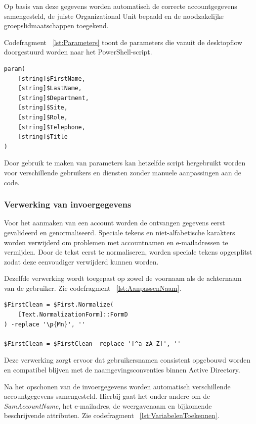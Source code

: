 Op basis van deze gegevens worden automatisch de correcte accountgegevens samengesteld, de juiste Organizational Unit bepaald en de noodzakelijke groepslidmaatschappen toegekend.

Codefragment ~\ref{lst:Parameters} toont de parameters die vanuit de desktopflow doorgestuurd worden naar het PowerShell-script.

\begin{listing}[ht]
\begin{verbatim}
param(
    [string]$FirstName,
    [string]$LastName,
    [string]$Department,
    [string]$Site,
    [string]$Role,
    [string]$Telephone,
    [string]$Title
)
\end{verbatim}
\caption{Parameters}
\label{lst:Parameters}
\end{listing}

Door gebruik te maken van parameters kan hetzelfde script hergebruikt worden voor verschillende gebruikers en diensten zonder manuele aanpassingen aan de code.

\subsubsection{Verwerking van invoergegevens}

Voor het aanmaken van een account worden de ontvangen gegevens eerst gevalideerd en genormaliseerd. Speciale tekens en niet-alfabetische karakters worden verwijderd om problemen met accountnamen en e-mailadressen te vermijden. Door de tekst eerst te normaliseren, worden speciale tekens opgesplitst zodat deze eenvoudiger verwijderd kunnen worden.

Dezelfde verwerking wordt toegepast op zowel de voornaam als de achternaam van de gebruiker. Zie codefragment ~\ref{lst:AanpassenNaam}.

\begin{listing}[ht]
\begin{verbatim}
$FirstClean = $First.Normalize(
    [Text.NormalizationForm]::FormD
) -replace '\p{Mn}', ''

$FirstClean = $FirstClean -replace '[^a-zA-Z]', ''
\end{verbatim}
\caption{Aanpassen naam}
\label{lst:AanpassenNaam}
\end{listing}

Deze verwerking zorgt ervoor dat gebruikersnamen consistent opgebouwd worden en compatibel blijven met de naamgevingsconventies binnen Active Directory.

Na het opschonen van de invoergegevens worden automatisch verschillende accountgegevens samengesteld. Hierbij gaat het onder andere om de \textit{SamAccountName}, het e-mailadres, de weergavenaam en bijkomende beschrijvende attributen. Zie codefragment ~\ref{lst:VariabelenToekennen}.

